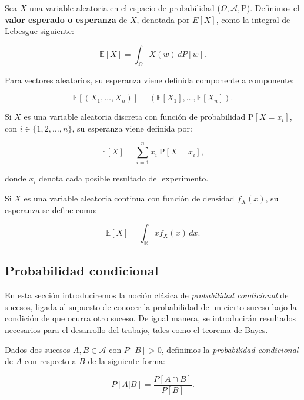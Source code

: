 \begin{definicion}\label{def:esperanza-variable-aleatoria}
Sea $X$ una variable aleatoria en el espacio de probabilidad ($\Omega, \mathcal{A}, \mathrm{P}$). Definimos el \textbf{valor esperado o esperanza} de $X$, denotada por $E[X]$, como la integral de Lebesgue siguiente:

\[ \mathbb{E}[X] = \int_{\Omega} X(w) \, dP[w]. \]

Para vectores aleatorios, su esperanza viene definida componente a componente:

\[ \mathbb{E}[(X_1, \ldots, X_n)] = (\mathbb{E}[X_1], \ldots, \mathbb{E}[X_n]). \]
\end{definicion}

\begin{observacion}
    Si $X$ es una variable aleatoria discreta con función de probabilidad $\mathrm{P}[X = x_i]$, con $i \in \{1,2,\ldots,n\}$, su esperanza viene definida por:

    \[ \mathbb{E}[X] = \sum_{i=1}^{n} x_i \: \mathrm{P}[X = x_i], \]

    donde $x_i$ denota cada posible resultado del experimento.
\end{observacion}

\begin{observacion}
    Si $X$ es una variable aleatoria continua con función de densidad $f_X(x)$, su esperanza se define como:

    \[ \mathbb{E}[X] =  \int_{\mathbb{R}} x f_X(x) \, dx. \]
\end{observacion}

\subsection{Probabilidad condicional}

En esta sección introduciremos la noción clásica de \emph{probabilidad condicional} de sucesos, ligada al supuesto de conocer la probabilidad de un cierto suceso bajo la condición de que ocurra otro suceso. De igual manera, se introducirán resultados necesarios para el desarrollo del trabajo, tales como el teorema de Bayes.

\begin{definicion}\label{def:probabilidad-condicional}
    Dados dos sucesos $A, B \in \mathcal{A}$ con $P[B] > 0$, definimos la \emph{probabilidad condicional} de $A$ con respecto a $B$ de la siguiente forma:

    \[ P[A|B] = \frac{P[A \cap B]}{P[B]}. \]
\end{definicion}

